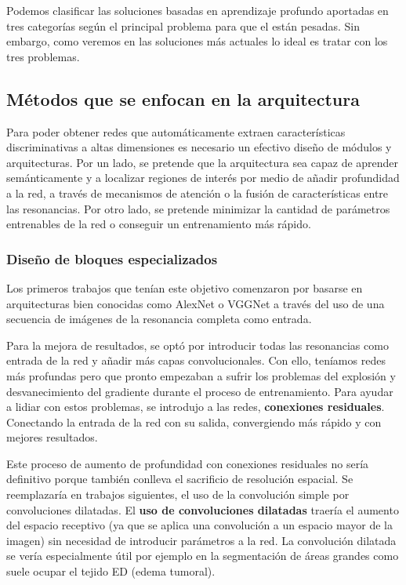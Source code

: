 	Podemos clasificar las soluciones basadas en aprendizaje profundo aportadas en tres categorías según el principal problema para que el están pesadas. Sin embargo, como veremos en las soluciones más actuales lo ideal es tratar con los tres problemas.
	
	\subsection{Métodos que se enfocan en la arquitectura}
		
		 Para poder obtener redes que automáticamente extraen características discriminativas a altas dimensiones es necesario un efectivo diseño de módulos y arquitecturas. Por un lado, se pretende que la arquitectura sea capaz de aprender semánticamente y a localizar regiones de interés por medio de añadir profundidad a la red, a través de mecanismos de atención o la fusión de características entre las resonancias. Por otro lado, se pretende minimizar la cantidad de parámetros entrenables de la red o conseguir un entrenamiento más rápido.
		 
		\subsubsection{Diseño de bloques especializados}
			
			Los primeros trabajos que tenían este objetivo comenzaron por basarse en arquitecturas bien conocidas como AlexNet o VGGNet a través del uso de una secuencia de imágenes de la resonancia completa como entrada.
			
			Para la mejora de resultados, se optó por introducir todas las resonancias como entrada de la red y añadir más capas convolucionales. Con ello, teníamos redes más profundas pero que pronto empezaban a sufrir los problemas del explosión y desvanecimiento del gradiente durante el proceso de entrenamiento. Para ayudar a lidiar con estos problemas, se introdujo a las redes, \textbf{conexiones residuales}.
			Conectando la entrada de la red con su salida, convergiendo más rápido y con mejores resultados. 
			
			Este proceso de aumento de profundidad con conexiones residuales no sería definitivo porque también conlleva el sacrificio de resolución espacial. Se reemplazaría en trabajos siguientes, el uso de la convolución simple por convoluciones dilatadas. El \textbf{uso de convoluciones dilatadas} traería el aumento del espacio receptivo (ya que se aplica una convolución a un espacio mayor de la imagen) sin necesidad de introducir parámetros a la red. La convolución dilatada se vería especialmente útil por ejemplo en la segmentación de áreas grandes como suele ocupar el tejido ED (edema tumoral). 
			
